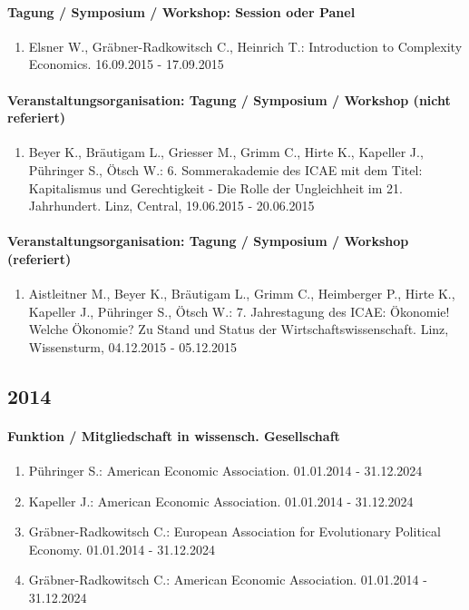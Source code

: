 \paragraph{Tagung / Symposium / Workshop: Session oder Panel} 
\begin{enumerate}[leftmargin=*, labelsep=0.5cm] 
 	 \item Elsner W., Gräbner-Radkowitsch C., Heinrich T.: Introduction to Complexity Economics. 16.09.2015 - 17.09.2015 
\end{enumerate} 
\paragraph{Veranstaltungsorganisation: Tagung / Symposium / Workshop (nicht referiert)} 
\begin{enumerate}[leftmargin=*, labelsep=0.5cm] 
 	 \item Beyer K., Bräutigam L., Griesser M., Grimm C., Hirte K., Kapeller J., Pühringer S., Ötsch W.: 6. Sommerakademie des ICAE mit dem Titel: Kapitalismus und Gerechtigkeit - Die Rolle der Ungleichheit im 21. Jahrhundert. Linz, Central, 19.06.2015 - 20.06.2015 
\end{enumerate} 
\paragraph{Veranstaltungsorganisation: Tagung / Symposium / Workshop (referiert)} 
\begin{enumerate}[leftmargin=*, labelsep=0.5cm] 
 	 \item Aistleitner M., Beyer K., Bräutigam L., Grimm C., Heimberger P., Hirte K., Kapeller J., Pühringer S., Ötsch W.: 7. Jahrestagung des ICAE: Ökonomie! Welche Ökonomie? Zu Stand und Status der Wirtschaftswissenschaft. Linz, Wissensturm, 04.12.2015 - 05.12.2015 
\end{enumerate} 
\subsection*{2014} 
\paragraph{Funktion / Mitgliedschaft in wissensch. Gesellschaft} 
\begin{enumerate}[leftmargin=*, labelsep=0.5cm] 
 	 \item Pühringer S.: American Economic Association. 01.01.2014 - 31.12.2024 
	 \item Kapeller J.: American Economic Association. 01.01.2014 - 31.12.2024 
	 \item Gräbner-Radkowitsch C.: European Association for Evolutionary Political Economy. 01.01.2014 - 31.12.2024 
	 \item Gräbner-Radkowitsch C.: American Economic Association. 01.01.2014 - 31.12.2024 
\end{enumerate} 

